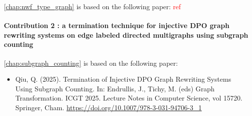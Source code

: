 \autoref{chap:nwf_type_graph} is based on the following paper:
\textcolor{red}{ref}
 
\paragraph{Contribution 2 : a termination technique for injective DPO graph rewriting systems on edge labeled directed multigraphs using subgraph counting}
\autoref{chap:subgraph_counting} is based on the following paper:
\begin{itemize}
    \item Qiu, Q. (2025). Termination of Injective DPO Graph Rewriting Systems Using Subgraph Counting. In: Endrullis, J., Tichy, M. (eds) Graph Transformation. ICGT 2025. Lecture Notes in Computer Science, vol 15720. Springer, Cham. \url{https://doi.org/10.1007/978-3-031-94706-3_1}
\end{itemize}
